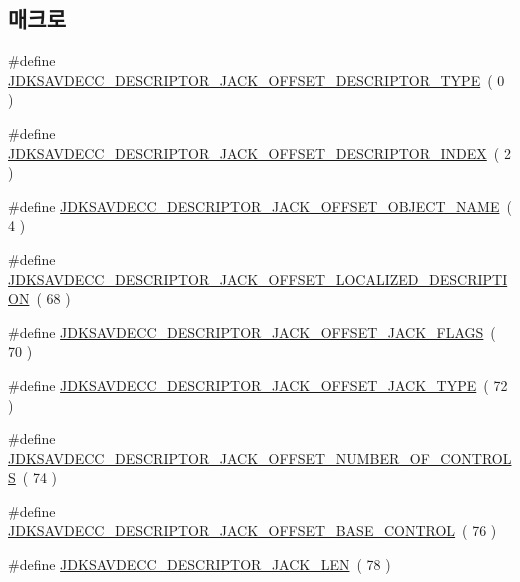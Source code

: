 \subsection*{매크로}
\begin{DoxyCompactItemize}
\item 
\#define \hyperlink{group__descriptor__jack_ga4763bc671c963f3313407a0b762f115e}{J\+D\+K\+S\+A\+V\+D\+E\+C\+C\+\_\+\+D\+E\+S\+C\+R\+I\+P\+T\+O\+R\+\_\+\+J\+A\+C\+K\+\_\+\+O\+F\+F\+S\+E\+T\+\_\+\+D\+E\+S\+C\+R\+I\+P\+T\+O\+R\+\_\+\+T\+Y\+PE}~( 0 )
\item 
\#define \hyperlink{group__descriptor__jack_ga210f344d95a77e3222709ffe40e83968}{J\+D\+K\+S\+A\+V\+D\+E\+C\+C\+\_\+\+D\+E\+S\+C\+R\+I\+P\+T\+O\+R\+\_\+\+J\+A\+C\+K\+\_\+\+O\+F\+F\+S\+E\+T\+\_\+\+D\+E\+S\+C\+R\+I\+P\+T\+O\+R\+\_\+\+I\+N\+D\+EX}~( 2 )
\item 
\#define \hyperlink{group__descriptor__jack_ga845a3b4e0f84ac5091905008cbac9185}{J\+D\+K\+S\+A\+V\+D\+E\+C\+C\+\_\+\+D\+E\+S\+C\+R\+I\+P\+T\+O\+R\+\_\+\+J\+A\+C\+K\+\_\+\+O\+F\+F\+S\+E\+T\+\_\+\+O\+B\+J\+E\+C\+T\+\_\+\+N\+A\+ME}~( 4 )
\item 
\#define \hyperlink{group__descriptor__jack_gab9473c47632ad9d35450c627bb203420}{J\+D\+K\+S\+A\+V\+D\+E\+C\+C\+\_\+\+D\+E\+S\+C\+R\+I\+P\+T\+O\+R\+\_\+\+J\+A\+C\+K\+\_\+\+O\+F\+F\+S\+E\+T\+\_\+\+L\+O\+C\+A\+L\+I\+Z\+E\+D\+\_\+\+D\+E\+S\+C\+R\+I\+P\+T\+I\+ON}~( 68 )
\item 
\#define \hyperlink{group__descriptor__jack_gab61bdeb27f9c6d20dbe464d7e75c593f}{J\+D\+K\+S\+A\+V\+D\+E\+C\+C\+\_\+\+D\+E\+S\+C\+R\+I\+P\+T\+O\+R\+\_\+\+J\+A\+C\+K\+\_\+\+O\+F\+F\+S\+E\+T\+\_\+\+J\+A\+C\+K\+\_\+\+F\+L\+A\+GS}~( 70 )
\item 
\#define \hyperlink{group__descriptor__jack_gaad24206c859700966b72a969cdb474dd}{J\+D\+K\+S\+A\+V\+D\+E\+C\+C\+\_\+\+D\+E\+S\+C\+R\+I\+P\+T\+O\+R\+\_\+\+J\+A\+C\+K\+\_\+\+O\+F\+F\+S\+E\+T\+\_\+\+J\+A\+C\+K\+\_\+\+T\+Y\+PE}~( 72 )
\item 
\#define \hyperlink{group__descriptor__jack_ga77ef880faf9b9485b98624fc4cd0027e}{J\+D\+K\+S\+A\+V\+D\+E\+C\+C\+\_\+\+D\+E\+S\+C\+R\+I\+P\+T\+O\+R\+\_\+\+J\+A\+C\+K\+\_\+\+O\+F\+F\+S\+E\+T\+\_\+\+N\+U\+M\+B\+E\+R\+\_\+\+O\+F\+\_\+\+C\+O\+N\+T\+R\+O\+LS}~( 74 )
\item 
\#define \hyperlink{group__descriptor__jack_gabe7a66f364508baf1dbad52069d37f33}{J\+D\+K\+S\+A\+V\+D\+E\+C\+C\+\_\+\+D\+E\+S\+C\+R\+I\+P\+T\+O\+R\+\_\+\+J\+A\+C\+K\+\_\+\+O\+F\+F\+S\+E\+T\+\_\+\+B\+A\+S\+E\+\_\+\+C\+O\+N\+T\+R\+OL}~( 76 )
\item 
\#define \hyperlink{group__descriptor__jack_ga3078d0ebe3d0d3bb58c01b9b0e984d23}{J\+D\+K\+S\+A\+V\+D\+E\+C\+C\+\_\+\+D\+E\+S\+C\+R\+I\+P\+T\+O\+R\+\_\+\+J\+A\+C\+K\+\_\+\+L\+EN}~( 78 )
\end{DoxyCompactItemize}
